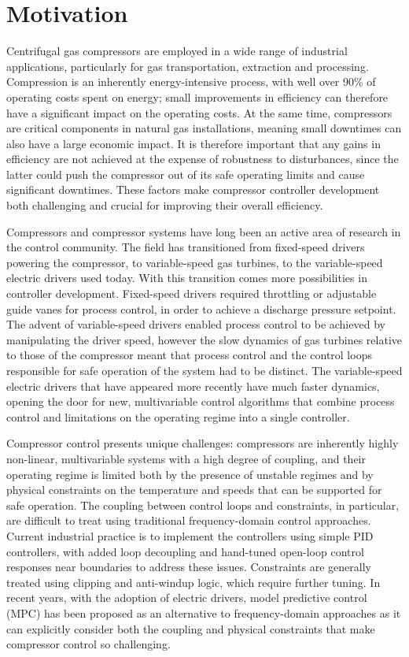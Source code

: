 \section{Motivation}
\label{sec:intro:motivation}

Centrifugal gas compressors are employed in a wide range of industrial applications, particularly for gas transportation, extraction and processing.
Compression is an inherently energy-intensive process, with well over 90\% of operating costs spent on energy; small improvements in efficiency can therefore have a significant impact on the operating costs.
At the same time, compressors are critical components in natural gas installations, meaning small downtimes can also have a large economic impact.
It is therefore important that any gains in efficiency are not achieved at the expense of robustness to disturbances, since the latter could push the compressor out of its safe operating limits and cause significant downtimes.
These factors make compressor controller development both challenging and crucial for improving their overall efficiency. 

Compressors and compressor systems have long been an active area of research in the control community.
The field has transitioned from fixed-speed drivers powering the compressor, to variable-speed gas turbines, to the variable-speed electric drivers used today.
With this transition comes more possibilities in controller development.
Fixed-speed drivers required throttling or adjustable guide vanes for process control, in order to achieve a discharge pressure setpoint.
The advent of variable-speed drivers enabled process control to be achieved by manipulating the driver speed, however the slow dynamics of gas turbines relative to those of the compressor meant that process control and the control loops responsible for safe operation of the system had to be distinct.
The variable-speed electric drivers that have appeared more recently have much faster dynamics, opening the door for new, multivariable control algorithms that combine process control and limitations on the operating regime into a single controller.

Compressor control presents unique challenges: compressors are inherently highly non-linear, multivariable systems with a high degree of coupling, and their operating regime is limited both by the presence of unstable regimes and by physical constraints on the temperature and speeds that can be supported for safe operation.
The coupling between control loops and constraints, in particular, are difficult to treat using traditional frequency-domain control approaches.
Current industrial practice is to implement the controllers using simple PID controllers, with added loop decoupling and hand-tuned open-loop control responses near boundaries to address these issues.
Constraints are generally treated using clipping and anti-windup logic, which require further tuning.
In recent years, with the adoption of electric drivers, model predictive control (MPC) has been proposed as an alternative to frequency-domain approaches as it can explicitly consider both the coupling and physical constraints that make compressor control so challenging.

